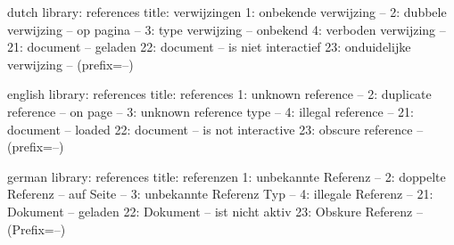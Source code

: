 

%

%
%

%
%


\unprotect

\startmessages  dutch  library: references
  title: verwijzingen
      1: onbekende verwijzing --
      2: dubbele verwijzing -- op pagina --
      3: type verwijzing -- onbekend
      4: verboden verwijzing --
     21: document -- geladen
     22: document -- is niet interactief
     23: onduidelijke verwijzing -- (prefix=--)
\stopmessages

\startmessages  english  library: references
  title: references
      1: unknown reference --
      2: duplicate reference -- on page --
      3: unknown reference type --
      4: illegal reference --
     21: document -- loaded
     22: document -- is not interactive
     23: obscure reference -- (prefix=--)
\stopmessages

\startmessages  german  library: references
  title: referenzen
      1: unbekannte Referenz --
      2: doppelte Referenz -- auf Seite --
      3: unbekannte Referenz Typ --
      4: illegale Referenz --
     21: Dokument -- geladen
     22: Dokument -- ist nicht aktiv
     23: Obskure Referenz -- (Prefix=--)
\stopmessages

